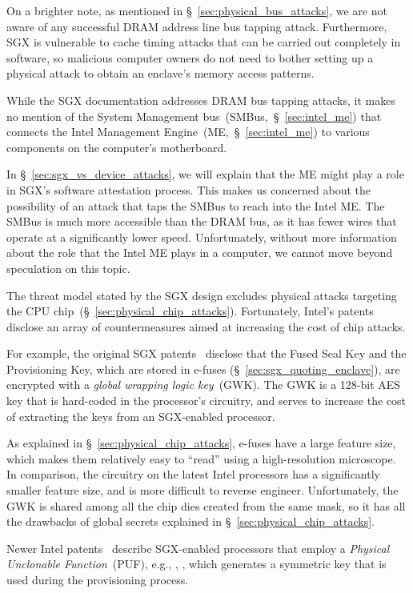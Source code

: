 On a brighter note, as mentioned in \S~\ref{sec:physical_bus_attacks}, we are
not aware of any successful DRAM address line bus tapping attack. Furthermore,
SGX is vulnerable to cache timing attacks that can be carried out completely in
software, so malicious computer owners do not need to bother setting up a
physical attack to obtain an enclave's memory access patterns.

While the SGX documentation addresses DRAM bus tapping attacks, it makes no
mention of the System Management bus~(SMBus,~\S~\ref{sec:intel_me}) that
connects the Intel Management Engine~(ME,~\S~\ref{sec:intel_me}) to various
components on the computer's motherboard.

In \S~\ref{sec:sgx_vs_device_attacks}, we will explain that the ME might play a
role in SGX's software attestation process. This makes us concerned about the
possibility of an attack that taps the SMBus to reach into the Intel ME. The
SMBus is much more accessible than the DRAM bus, as it has fewer wires that
operate at a significantly lower speed. Unfortunately, without more information
about the role that the Intel ME plays in a computer, we cannot move beyond
speculation on this topic.

The threat model stated by the SGX design excludes physical attacks targeting
the CPU chip~(\S~\ref{sec:physical_chip_attacks}). Fortunately, Intel's patents
disclose an array of countermeasures aimed at increasing the cost of chip
attacks.

For example, the original SGX patents~\cite{intel2013patent1, intel2013patent2}
disclose that the Fused Seal Key and the Provisioning Key, which are stored in
e-fuses (\S~\ref{sec:sgx_quoting_enclave}), are encrypted with a \textit{global
wrapping logic key}~(GWK). The GWK is a 128-bit AES key that is hard-coded in
the processor's circuitry, and serves to increase the cost of extracting the
keys from an SGX-enabled processor.

As explained in \S~\ref{sec:physical_chip_attacks}, e-fuses have a large
feature size, which makes them relatively easy to ``read'' using a
high-resolution microscope. In comparison, the circuitry on the latest Intel
processors has a significantly smaller feature size, and is more difficult to
reverse engineer. Unfortunately, the GWK is shared among all the chip dies
created from the same mask, so it has all the drawbacks of global secrets
explained in \S~\ref{sec:physical_chip_attacks}.

Newer Intel patents~\cite{gotze2014provisioning, gotze2014provisioning2}
describe SGX-enabled processors that employ a \textit{Physical Unclonable
Function}~(PUF), e.g., \cite{suh2007puf}, \cite{maes2009puf}, which generates a
symmetric key that is used during the provisioning process.

